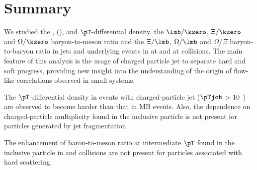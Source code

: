 
\clearpage
\section{Summary}%
\label{sec:Summary}

We studied the \kzero, \lmb (\almb), \Xis and \Oms $\pT$-differential density, the $\lmb/\kzero$, $\Xi/\kzero$ and $\Omega/\kzero$ baryon-to-meson ratio and the $\Xi/\lmb$, $\Omega/\lmb$ and $\Omega/\Xi$ baryon-to-baryon ratio in jets and underlying events in \pp at \thirteen and \pPb at \fivenn collisions.
The main feature of this analysis is the usage of charged particle jet to separate hard and soft progress, providing new insight into the understanding of the origin of flow-like correlations observed in small systems.

The $\pT$-differential density in events with charged-particle jet ($\pTjch$ > 10~\GeVc) are observed to become harder than that in MB events.
Also, the dependence on charged-particle multiplicity found in the inclusive particle is not present for particles generated by jet fragmentation.

The enhancement of baron-to-meson ratio at intermediate $\pT$ found in the inclusive particle in \pp and \pPb collisions are not present for particles associated with hard scattering.
